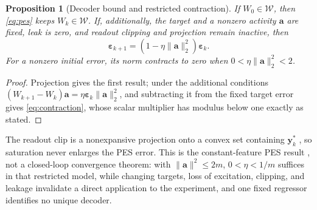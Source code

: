 \documentclass[letterpaper, 10 pt, conference]{ieeeconf}
\newtheorem{proposition}{Proposition}
\newtheorem{remark}{Remark}
\begin{document}
\begin{proposition}[Decoder bound and restricted contraction]
\label{prop:pes}
If $W_0\in\mathcal W$, then \eqref{eq:pes} keeps $W_k\in\mathcal W$.
If, additionally, the target and a nonzero activity $\bm a$ are fixed,
leak is zero, and readout clipping and projection remain inactive, then
\begin{equation}
 \bm\varepsilon_{k+1}
       =(1-\eta\|\bm a\|_2^2)\bm\varepsilon_k.
 \label{eq:contraction}
\end{equation}
For a nonzero initial error, its norm contracts to zero when
$0<\eta\|\bm a\|_2^2<2$.
\end{proposition}
\begin{proof}
Projection gives the first result; under the additional conditions
$(W_{k+1}-W_k)\bm a=\eta\bm\varepsilon_k\|\bm a\|_2^2$, and subtracting it
from the fixed target error gives \eqref{eq:contraction}, whose scalar
multiplier has modulus below one exactly as stated.
\end{proof}
The readout clip is a nonexpansive projection onto a convex set containing
$\bm y_k^*$ \cite{bauschke2017convex}, so saturation never enlarges the PES
error. This is the constant-feature PES result \cite{voelker2015pes}, not a
closed-loop convergence theorem: with $\|\bm a\|^2\le2m$, $0<\eta<1/m$
suffices in that restricted model, while changing targets, loss of
excitation, clipping, and leakage invalidate a direct application to the
experiment, and one fixed regressor identifies no unique decoder.

\end{document}
